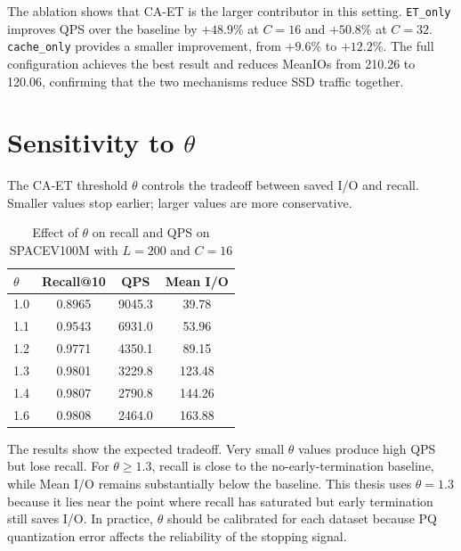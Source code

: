 The ablation shows that CA-ET is the larger contributor in this setting.
\texttt{ET\_only} improves QPS over the baseline by $+48.9\%$ at $C=16$ and $+50.8\%$ at $C=32$.
\texttt{cache\_only} provides a smaller improvement, from $+9.6\%$ to $+12.2\%$.
The full configuration achieves the best result and reduces MeanIOs from 210.26 to 120.06, confirming that the two mechanisms reduce SSD traffic together.

\section{Sensitivity to $\theta$}
\label{sec:eval-theta}

The CA-ET threshold $\theta$ controls the tradeoff between saved I/O and recall.
Smaller values stop earlier; larger values are more conservative.

\begin{table}[h]
\centering
\caption[Effect of theta on recall and QPS]{Effect of $\theta$ on recall and QPS on SPACEV100M with $L=200$ and $C=16$}
\label{tab:eval-theta}
\begin{tabular}{lccc}
\toprule
$\theta$ & Recall@10 & QPS & Mean I/O \\
\midrule
1.0 & 0.8965 & 9045.3 & 39.78 \\
1.1 & 0.9543 & 6931.0 & 53.96 \\
1.2 & 0.9771 & 4350.1 & 89.15 \\
1.3 & 0.9801 & 3229.8 & 123.48 \\
1.4 & 0.9807 & 2790.8 & 144.26 \\
1.6 & 0.9808 & 2464.0 & 163.88 \\
\bottomrule
\end{tabular}
\end{table}

The results show the expected tradeoff.
Very small $\theta$ values produce high QPS but lose recall.
For $\theta \ge 1.3$, recall is close to the no-early-termination baseline, while Mean I/O remains substantially below the baseline.
This thesis uses $\theta=1.3$ because it lies near the point where recall has saturated but early termination still saves I/O.
In practice, $\theta$ should be calibrated for each dataset because PQ quantization error affects the reliability of the stopping signal.
